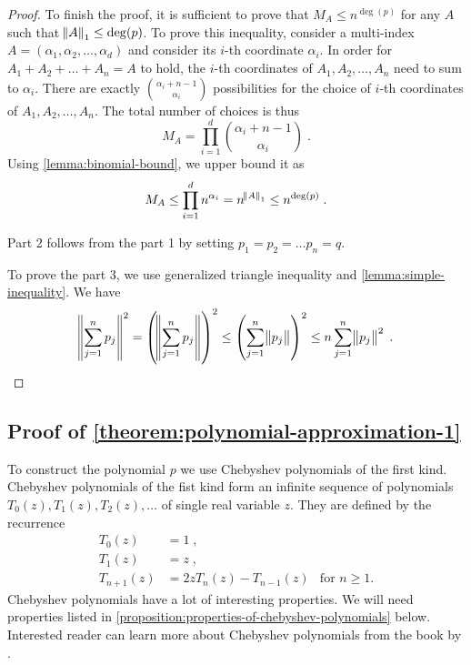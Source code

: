 \documentclass[12pt]{article}
\begin{document}
\begin{proof}
To finish the proof, it is sufficient to prove that $M_A \le n^{\deg(p)}$ for
any $A$ such that $\norm{A}_1 \le \deg(p)$. To prove this inequality, consider a
multi-index $A = (\alpha_1, \alpha_2, \dots, \alpha_d)$ and consider its $i$-th coordinate
$\alpha_i$. In order for $A_1 + A_2 + \dots + A_n = A$ to hold, the $i$-th
coordinates of $A_1, A_2, \dots, A_n$ need to sum to $\alpha_i$. There are exactly
$\binom{\alpha_i + n - 1}{\alpha_i}$ possibilities for the choice of $i$-th
coordinates of $A_1, A_2, \dots, A_n$. The total number of choices is thus
$$
M_A = \prod_{i=1}^d \binom{\alpha_i + n - 1}{\alpha_i} \; .
$$
Using \autoref{lemma:binomial-bound}, we upper bound it as
$$
M_A \le \prod_{i=1}^d n^{\alpha_i} = n^{\norm{A}_1} \le n^{\deg(p)} \; .
$$

Part 2 follows from the part 1 by setting $p_1 = p_2 = \dots p_n = q$.

To prove the part 3, we use generalized triangle inequality and
\autoref{lemma:simple-inequality}. We have
\begin{align*}
\norm{\sum_{j=1}^n p_j}^2 = \left( \norm{\sum_{j=1}^n p_j} \right)^2 \le \left(\sum_{j=1}^n \norm{p_j} \right)^2 \le n \sum_{j=1}^n \norm{p_j}^2 \; .
\end{align*}
\end{proof}

\subsection{Proof of \autoref{theorem:polynomial-approximation-1}}
\label{section:proof-of-polynomial-approximation-1}

To construct the polynomial $p$ we use Chebyshev polynomials of the first kind.
Chebyshev polynomials of the fist kind form an infinite sequence of polynomials
$T_0(z), T_1(z), T_2(z), \dots$ of single real variable $z$. They are defined
by the recurrence
\begin{align*}
T_0(z) & = 1 \; , \\
T_1(z) & = z \; , \\
T_{n+1}(z) & = 2zT_n(z) - T_{n-1}(z) & \text{for $n \ge 1$.}
\end{align*}
Chebyshev polynomials have a lot of interesting properties.
We will need properties listed in
\autoref{proposition:properties-of-chebyshev-polynomials} below.
Interested reader can learn more about Chebyshev polynomials
from the book by \cite{Mason-Handscomb-2002}.
\end{document}
